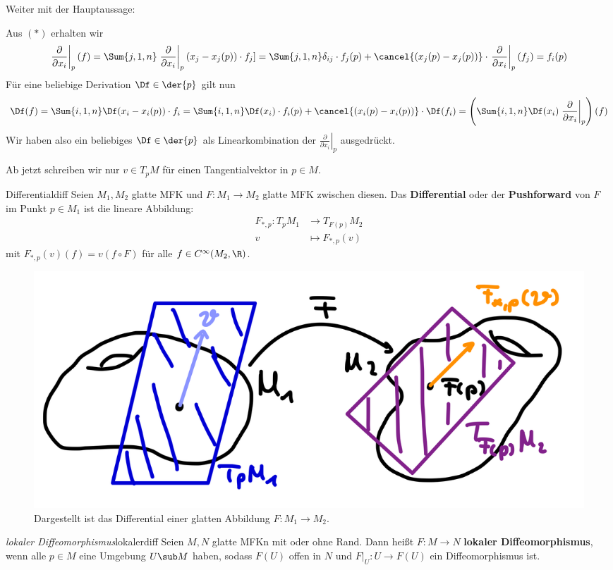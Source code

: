 Weiter mit der Hauptaussage:
\begin{beweis}
Aus $(\ast)$ erhalten wir
\begin{equation}
\left. \frac{\partial}{\partial x_i}\right|_p (f) = \Sum{j,1,n} \left. \frac{\partial}{\partial x_i}\right|_p (x_j - x_j(p)) \cdot f_j] = \Sum{j,1,n} \delta_{ij} \cdot f_j (p) + \cancel{(x_j(p)-x_j(p))} \cdot \left. \frac{\partial}{\partial x_i}\right|_p (f_j) = f_i(p)
\end{equation}
Für eine beliebige Derivation $\Df \in \der{p}$ gilt nun
\begin{equation}
\Df (f) = \Sum{i, 1,n} \Df(x_i - x_i (p)) \cdot f_i = \Sum{i,1,n} \Df(x_i) \cdot f_i(p)+\cancel{(x_i(p)-x_i(p))} \cdot \Df (f_i) = \left( \Sum{i,1,n} \Df (x_i) \left.\frac{\partial}{\partial x_i}\right|_p \right)(f)
\end{equation}
Wir haben also ein beliebiges $\Df \in \der{p}$ als Linearkombination der $\left.\frac{\partial}{\partial x_i}\right|_p$ ausgedrückt.
\end{beweis}
\begin{warning}
Ab jetzt schreiben wir nur $v \in T_pM$ für einen Tangentialvektor in $p \in M$.
\end{warning}
\begin{definition}{Differential}{diff}
Seien $M_1, M_2$ glatte MFK und $F: M_1 \to M_2$ glatte MFK zwischen diesen. Das \textbf{Differential} oder der \textbf{Pushforward} von $F$ im Punkt $p \in M_1$ ist die lineare Abbildung:
\begin{align}
F_{\ast, p}: T_pM_1 &\to T_{F(p)}M_2 \\
v &\mapsto F_{\ast, p} (v)
\end{align}
mit $F_{\ast, p} (v)(f) = v(f \circ F)$ für alle $f \in C^\infty (M_2, \R)$.
\begin{figure}[H]
\label{fig:differential}
\centering
\includegraphics[width=0.3\linewidth]{Bilder/differential.png}
\caption{Dargestellt ist das Differential einer glatten Abbildung $F: M_1 \to M_2$.}
\end{figure}
\end{definition}
\begin{definition}{\textit{lokaler Diffeomorphismus}}{lokalerdiff}
Seien $M,N$ glatte MFKn mit oder ohne Rand. Dann heißt $F: M \to N$ \textbf{lokaler Diffeomorphismus}, wenn alle $p \in M$ eine Umgebung $U \sub M$ haben, sodass $F(U)$ offen in $N$ und $F|_U: U \to F(U)$ ein Diffeomorphismus ist.
\end{definition}
